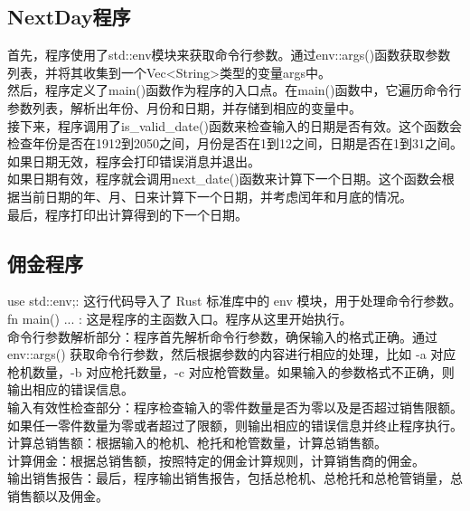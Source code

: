 \documentclass{article}
\begin{document}
\subsection{NextDay程序}

首先，程序使用了std::env模块来获取命令行参数。通过env::args()函数获取参数列表，并将其收集到一个Vec<String>类型的变量args中。\\
然后，程序定义了main()函数作为程序的入口点。在main()函数中，它遍历命令行参数列表，解析出年份、月份和日期，并存储到相应的变量中。\\
接下来，程序调用了is\_valid\_date()函数来检查输入的日期是否有效。这个函数会检查年份是否在1912到2050之间，月份是否在1到12之间，日期是否在1到31之间。如果日期无效，程序会打印错误消息并退出。\\
如果日期有效，程序就会调用next\_date()函数来计算下一个日期。这个函数会根据当前日期的年、月、日来计算下一个日期，并考虑闰年和月底的情况。\\
最后，程序打印出计算得到的下一个日期。\\

\subsection{佣金程序}

    use std::env;: 这行代码导入了 Rust 标准库中的 env 模块，用于处理命令行参数。\\

    fn main() { ... }: 这是程序的主函数入口。程序从这里开始执行。\\

    命令行参数解析部分：程序首先解析命令行参数，确保输入的格式正确。通过 env::args() 获取命令行参数，然后根据参数的内容进行相应的处理，比如 -a 对应枪机数量，-b 对应枪托数量，-c 对应枪管数量。如果输入的参数格式不正确，则输出相应的错误信息。\\

    输入有效性检查部分：程序检查输入的零件数量是否为零以及是否超过销售限额。如果任一零件数量为零或者超过了限额，则输出相应的错误信息并终止程序执行。\\

    计算总销售额：根据输入的枪机、枪托和枪管数量，计算总销售额。\\

    计算佣金：根据总销售额，按照特定的佣金计算规则，计算销售商的佣金。\\

    输出销售报告：最后，程序输出销售报告，包括总枪机、总枪托和总枪管销量，总销售额以及佣金。\\
\end{document}
